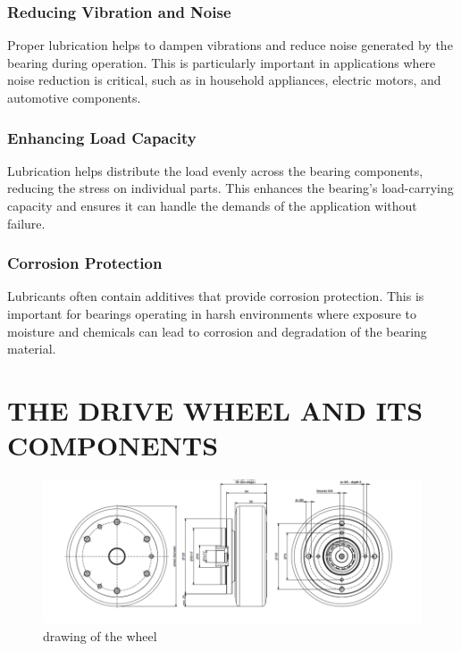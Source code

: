 \documentclass[../../main]{subfiles}
\begin{document}
\subsubsection{Reducing Vibration and Noise}
Proper lubrication helps to dampen vibrations and reduce noise generated by the bearing during operation. This is particularly important in applications where noise reduction is critical, such as in household appliances, electric motors, and automotive components.

\subsubsection{Enhancing Load Capacity}
Lubrication helps distribute the load evenly across the bearing components, reducing the stress on individual parts. This enhances the bearing's load-carrying capacity and ensures it can handle the demands of the application without failure.

\subsubsection{Corrosion Protection}
Lubricants often contain additives that provide corrosion protection. This is important for bearings operating in harsh environments where exposure to moisture and chemicals can lead to corrosion and degradation of the bearing material.


\section{THE DRIVE WHEEL AND ITS COMPONENTS }

\begin{figure}
  \centering
  \includegraphics[width=\textwidth]{img/Picture1.png}
  \caption{drawing of the wheel}
  \label{wheel}
\end{figure}
\end{document}
